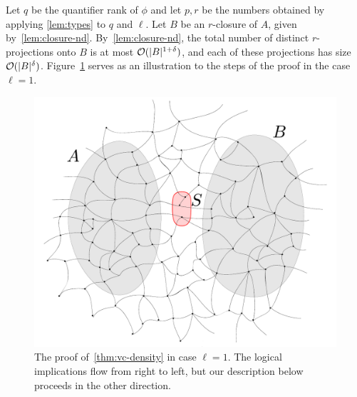 	Let $q$ be the quantifier rank of $\phi$ and let 
$p,r$ be the numbers obtained by applying \cref{lem:types} to $q$ and $\ell$.
Let $B$ be an $r$-closure of $A$, given by~\cref{lem:closure-nd}.
  By~\cref{lem:closure-nd}, the total number of distinct $r$-projections onto $B$ 
  is at most $\mathcal{O}(|B|^{1+\delta})$, and each of these projections has size $\mathcal{O}(|B|^{\delta})$.
  	   Figure~\ref{fig:sketch} serves as  an illustration to the steps of the proof in the case $\ell=1$.
  	   \begin{figure}[h!]
  	   	\centering
  	   		\includegraphics[scale=0.346,page=4]{pics}
%
%
  			\caption{The proof of~\cref{thm:vc-density} in case $\ell=1$. 
  The logical implications flow from right to left,
  but our description below proceeds in the other direction.
  			}
  	   	\label{fig:sketch}
  	   \end{figure}
	
